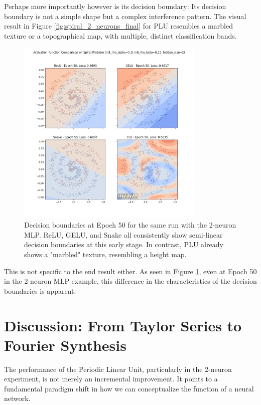 \documentclass[11pt, letterpaper]{article}
\begin{document}
Perhaps more importantly however is its decision boundary: Its decision boundary is not a simple shape but a complex interference pattern. The visual result in Figure \ref{fig:spiral_2_neurons_final} for PLU resembles a marbled texture or a topographical map, with multiple, distinct classification bands.

\begin{figure}[H]
    \centering
    \includegraphics[width=0.8\textwidth]{Examples/spiral_activation_comparison_hidden_neurons_2_epoch_50.jpg}
    \caption{Decision boundaries at Epoch 50 for the same run with the 2-neuron MLP. ReLU, GELU, and Snake all consistently show semi-linear decision boundaries at this early stage. In contrast, PLU already shows a "marbled" texture, resembling a height map.}
    \label{fig:spiral_2_neurons_early}
\end{figure}

This is not specific to the end result either. As seen in Figure \ref{fig:spiral_2_neurons_early}, even at Epoch 50 in the 2-neuron MLP example, this difference in the characteristics of the decision boundaries is apparent.

\section{Discussion: From Taylor Series to Fourier Synthesis}

The performance of the Periodic Linear Unit, particularly in the 2-neuron experiment, is not merely an incremental improvement. It points to a fundamental paradigm shift in how we can conceptualize the function of a neural network.
\end{document}
